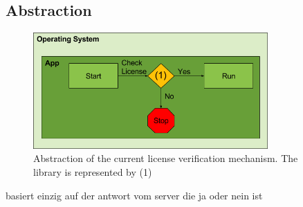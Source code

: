 \subsection{Abstraction} \label{section:license-abstraction}
\begin{figure}[h]
    \centering
    \includegraphics[width=0.8\textwidth]{data/verificationNow.png}
    \caption{Abstraction of the current license verification mechanism. The library is represented by (1)}
    \label{fig:verificationNow}
\end{figure}


basiert einzig auf der antwort vom server die ja oder nein ist
